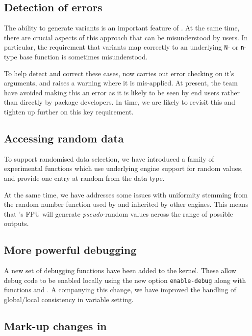 \documentclass{ltnews}
\begin{document}
\subsection{Detection of  errors}

The ability to generate variants is an important feature of . At
the same time,  there are crucial aspects of this approach that can be
misunderstood by users. In particular, the requirement that variants map
correctly to an underlying \verb|N|- or \verb|n|-type base function is sometimes
misunderstood.

To help detect and correct these cases,  now
carries out error checking on it's arguments, and raises a warning where
it is mis-applied. At present, the team have avoided making this an error
as it is likely to be seen by end users rather than directly by package
developers. In time, we are likely to revisit this and tighten up
further on this key requirement.

\subsection{Accessing random data}

To support randomised data selection, we have introduced a family of
experimental functions which use underlying engine support for random values,
and provide one entry at random from the data type.

At the same time, we have addresses some issues with uniformity stemming from
the random number function used by  and inherited by other
engines. This means that 's FPU will generate \emph{pseudo}-random
values across the range of possible outputs.

\subsection{More powerful debugging}

A new set of debugging functions have been added to the kernel. These allow
debug code to be enabled locally using the new option \verb|enable-debug| along
with functions  and . A companying this change, we
have improved the handling of global/local consistency in variable setting.

\subsection{Mark-up changes in }
\end{document}
